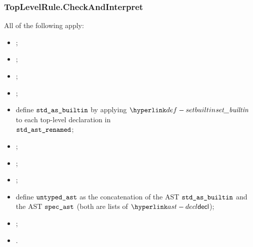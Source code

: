 \subsubsection{TopLevelRule.CheckAndInterpret\label{sec:TopLevelRule.CheckAndInterpret}}
\ProseParagraph
All of the following apply:
\begin{itemize}
    \item \Proseaslscan{$\vstdtext$}{$\spectoken$}{$\vstdtokens$\ProseTerminateAs{\LexicalErrorConfig}};
    \item \Proseaslparse{$\vstdtokens$}{$\vstdparse$\ProseTerminateAs{\ParseErrorConfig}};
    \item \Prosebuildast{$\vstdparse$}{$\vstdast$\ProseTerminateAs{\BuildErrorConfig}};
    \item \Proserenamelocals{\vstdast}{\vstdastrenamed};
    \item define $\texttt{std\_as\_builtin}$ by applying $\setbuiltin$ to each top-level declaration in\\
          $\texttt{std\_ast\_renamed}$\ProseTerminateAs{\BuildErrorConfig};
    \item \Proseaslscan{$\vspectext$}{$\spectoken$}{$\vspectokens$\ProseTerminateAs{\LexicalErrorConfig}};
    \item \Proseaslparse{$\vspectokens$}{$\vspecparse$\ProseTerminateAs{\ParseErrorConfig}};
    \item \Prosebuildast{$\vspecparse$}{$\vspecast$\ProseTerminateAs{\BuildErrorConfig}};
    \item define $\texttt{untyped\_ast}$ as the concatenation of the AST $\texttt{std\_as\_builtin}$ and
          the AST $\vspecast$ (both are lists of $\decl$);
    \item {};
    \item {}.
\end{itemize}

